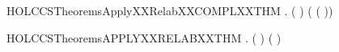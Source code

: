 \begin{SaveVerbatim}{HOLCCSTheoremsApplyXXRelabXXCOMPLXXTHM}
\HOLTokenTurnstile{} \HOLSymConst{\HOLTokenForall{}} .
         ( ) \HOLSymConst{=}
        (  ( ))
\end{SaveVerbatim}
\newcommand{\HOLCCSTheoremsApplyXXRelabXXCOMPLXXTHM}{\UseVerbatim{HOLCCSTheoremsApplyXXRelabXXCOMPLXXTHM}}
\begin{SaveVerbatim}{HOLCCSTheoremsAPPLYXXRELABXXTHM}
\HOLTokenTurnstile{} \HOLSymConst{\HOLTokenForall{}} .
       (  \HOLSymConst{=}  ) \HOLSymConst{\HOLTokenEquiv{}}
       (  \HOLSymConst{=}  )
\end{SaveVerbatim}
\newcommand{\HOLCCSTheoremsAPPLYXXRELABXXTHM}{\UseVerbatim{HOLCCSTheoremsAPPLYXXRELABXXTHM}}
